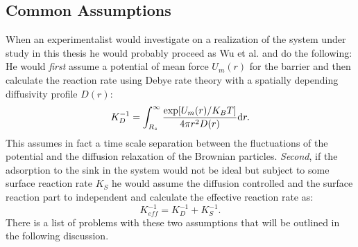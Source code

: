 \subsection{Common Assumptions}
When an experimentalist would investigate on a realization of the system under study in this thesis he would probably proceed as Wu et al. \cite{Wu2012a} and do the following: \\ 
He would \emph{first} assume a potential of mean force $U_m(r)$ for the barrier and then calculate the reaction rate using Debye rate theory with a spatially depending diffusivity profile $D(r)$:
\begin{equation}
    K_D^{-1} = \int_{R_s}^{\infty}\frac{\exp[U_m(r)/K_B T]}{4 \pi r^{2} D(r)} {\rm d} r.
    \label{YSDebye}
\end{equation}
This assumes in fact a time scale separation between the fluctuations of the potential and the diffusion relaxation of the Brownian particles.
\emph{Second}, if the adsorption to the sink in the system would not be ideal but subject to some surface reaction rate $K_S$ he would assume the diffusion controlled and the surface reaction part to independent and calculate the effective reaction rate as:
\begin{equation}
    K_{eff}^{-1} = K_D^{-1} + K_S^{-1}.
    \label{Keff}
\end{equation}
There is a list of problems with these two assumptions that will be outlined in the following discussion. \\
